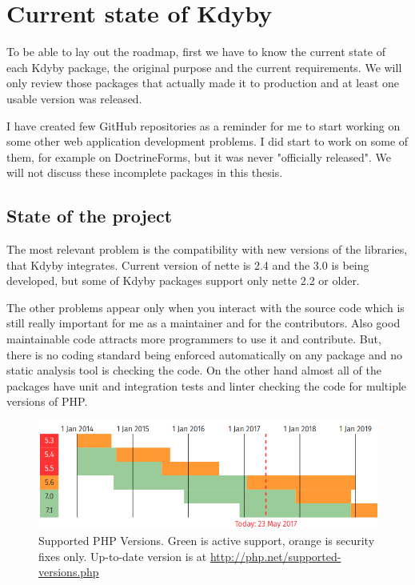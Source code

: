 \chapter{Current state of Kdyby}

To be able to lay out the roadmap, first we have to know the current state of each Kdyby package, the original purpose and the current requirements. We will only review those packages that actually made it to production and at least one usable version was released.

I have created few GitHub repositories as a reminder for me to start working on some other web application development problems. I did start to work on some of them, for example on DoctrineForms, but it was never "officially released". We will not discuss these incomplete packages in this thesis.

\section{State of the project}

The most relevant problem is the compatibility with new versions of the libraries, that Kdyby integrates. Current version of \gls{nette} is 2.4 and the 3.0 is being developed, but some of Kdyby packages support only \gls{nette} 2.2 or older.

The other problems appear only when you interact with the source code which is still really important for me as a maintainer and for the contributors. Also good maintainable code attracts more programmers to use it and contribute. But, there is no coding standard being enforced automatically on any package and no static analysis tool is checking the code. On the other hand almost all of the packages have unit and integration tests and linter checking the code for multiple versions of PHP.

\begin{figure} \label{fig:php:supported-versions}
  \centering
    \includegraphics[width=1\textwidth]{src/assets/php-supported-versions.png}
  \caption{Supported PHP Versions. Green is active support, orange is security fixes only. Up-to-date version is at \url{http://php.net/supported-versions.php}}
\end{figure}


